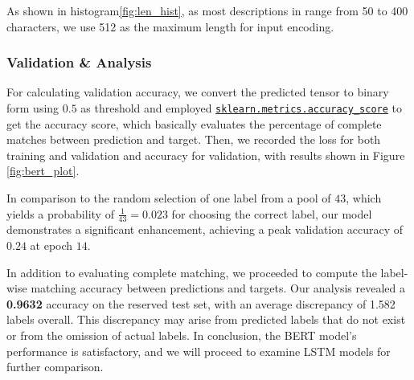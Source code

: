 \documentclass{article}
\begin{document}
As shown in histogram\ref{fig:len_hist}, as most descriptions in range from 50 to 400 characters, we use 512 as the maximum length for input encoding.


\subsubsection{Validation \& Analysis}
For calculating validation accuracy, we convert the predicted tensor to binary form using $0.5$ as threshold and employed \href{https://scikit-learn.org/stable/modules/generated/sklearn.metrics.accuracy_score.html}{\texttt{sklearn.metrics.accuracy\_score}} to get the accuracy score, which basically evaluates the percentage of complete matches between prediction and target. Then, we recorded the loss for both training and validation and accuracy for validation, with results shown in Figure \ref{fig:bert_plot}.



In comparison to the random selection of one label from a pool of $43$, which yields a probability of ${\displaystyle \frac{1}{43}=0.023}$ for choosing the correct label, our model demonstrates a significant enhancement, achieving a peak validation accuracy of $0.24$ at epoch $14$. 

In addition to evaluating complete matching, we proceeded to compute the label-wise matching accuracy between predictions and targets. Our analysis revealed a \textbf{0.9632} accuracy on the reserved test set, with an average discrepancy of 1.582 labels overall. This discrepancy may arise from predicted labels that do not exist or from the omission of actual labels. In conclusion, the BERT model’s performance is satisfactory, and we will proceed to examine LSTM models for further comparison.
\end{document}
